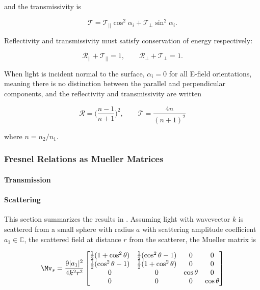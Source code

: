 and the transmissivity is

\begin{equation}
    \mathcal{T} = \mathcal{T}_{||} \cos^2{\alpha_i} + \mathcal{T}_{\perp} \sin^2{\alpha_i}.
\end{equation}

Reflectivity and transmissivity must satisfy conservation of energy respectively:

\begin{equation}
    \mathcal{R}_{||} + \mathcal{T}_{||} = 1, \qquad \mathcal{R}_{\perp} + \mathcal{T}_{\perp} = 1.
\end{equation}

When light is incident normal to the surface, $\alpha_i = 0$ for all E-field orientations, meaning there is no distinction between the parallel and perpendicular components, and the reflectivity and transmissivity are written

\begin{equation}
    \mathcal{R} = \bigg(\frac{n - 1}{n+1} \bigg)^2, \qquad \mathcal{T} = \frac{4n}{(n + 1)^2}
\end{equation}

where $n = n_2 / n_1$.

\subsubsection{Fresnel Relations as Mueller Matrices}
\paragraph{Transmission}


\paragraph{Scattering}
This section summarizes the results in \cite{bohren2008absorption}. Assuming light with wavevector $k$ is scattered from a small sphere with radius $a$ with scattering amplitude coefficient $a_1 \in \mathbb{C}$, the scattered field at distance $r$ from the scatterer, the Mueller matrix is

\begin{equation}
    \Mv_s = \frac{9|a_1|^2}{4k^2r^2}
    \begin{bmatrix}
        \tfrac{1}{2}(1 + \cos^2{\theta}) & \tfrac{1}{2}(\cos^2{\theta} - 1) & 0 & 0 \\
        \tfrac{1}{2}(\cos^2{\theta} - 1) & \tfrac{1}{2}(1 + \cos^2{\theta}) & 0 & 0 \\
        0 & 0 & \cos{\theta} & 0 \\ 
        0 & 0 & 0 & \cos{\theta}
    \end{bmatrix}
\end{equation}

